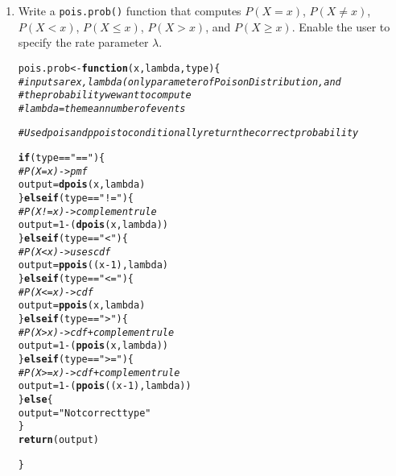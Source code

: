 \documentclass{article}\usepackage[]{graphicx}\usepackage[]{xcolor}
\makeatletter
\newcommand{\hlnum}[1]{\textcolor[rgb]{0.686,0.059,0.569}{#1}}%
\newcommand{\hlsng}[1]{\textcolor[rgb]{0.192,0.494,0.8}{#1}}%
\newcommand{\hlcom}[1]{\textcolor[rgb]{0.678,0.584,0.686}{\textit{#1}}}%
\newcommand{\hlopt}[1]{\textcolor[rgb]{0,0,0}{#1}}%
\newcommand{\hldef}[1]{\textcolor[rgb]{0.345,0.345,0.345}{#1}}%
\newcommand{\hlkwa}[1]{\textcolor[rgb]{0.161,0.373,0.58}{\textbf{#1}}}%
\newcommand{\hlkwb}[1]{\textcolor[rgb]{0.69,0.353,0.396}{#1}}%
\newcommand{\hlkwc}[1]{\textcolor[rgb]{0.333,0.667,0.333}{#1}}%
\newcommand{\hlkwd}[1]{\textcolor[rgb]{0.737,0.353,0.396}{\textbf{#1}}}%
\newenvironment{kframe}{%
 \def\at@end@of@kframe{}%
 \ifinner\ifhmode%
  \def\at@end@of@kframe{\end{minipage}}%
  \begin{minipage}{\columnwidth}%
 \fi\fi%
 \def\FrameCommand##1{\hskip\@totalleftmargin \hskip-\fboxsep
 \colorbox{shadecolor}{##1}\hskip-\fboxsep
     \hskip-\linewidth \hskip-\@totalleftmargin \hskip\columnwidth}%
 \MakeFramed {\advance\hsize-\width
   \@totalleftmargin\z@ \linewidth\hsize
   \@setminipage}}%
 {\par\unskip\endMakeFramed%
 \at@end@of@kframe}
\newenvironment{knitrout}{}{} %
\makeatother
\begin{document}
  \begin{enumerate}
    \item Write a \texttt{pois.prob()} function that computes $P(X=x)$, 
    $P(X \neq x)$, $P(X<x)$, $P(X \leq x)$, $P(X > x)$, and $P(X \geq x).$ Enable the user to specify the rate parameter $\lambda$.
\begin{knitrout}\scriptsize
{}\color{fgcolor}\begin{kframe}
\begin{alltt}
\hldef{pois.prob} \hlkwb{<-} \hlkwa{function}\hldef{(}\hlkwc{x}\hldef{,} \hlkwc{lambda}\hldef{,} \hlkwc{type}\hldef{)\{}
  \hlcom{# inputs are x, lambda (only parameter of Poison Distribution, and }
  \hlcom{#the probability we want to compute}
  \hlcom{# lambda = the mean number of events}

  \hlcom{# Use dpois and ppois to conditionally return the correct probability}

  \hlkwa{if} \hldef{(type} \hlopt{==} \hlsng{"=="}\hldef{)\{}
    \hlcom{# P(X = x) -> pmf}
    \hldef{output} \hlkwb{=} \hlkwd{dpois}\hldef{(x, lambda)}
  \hldef{\}}\hlkwa{else if} \hldef{(type} \hlopt{==} \hlsng{"!="}\hldef{)\{}
    \hlcom{# P(X != x) -> complement rule}
    \hldef{output} \hlkwb{=} \hlnum{1} \hlopt{-} \hldef{(}\hlkwd{dpois}\hldef{(x, lambda))}
  \hldef{\}}\hlkwa{else if} \hldef{(type} \hlopt{==} \hlsng{"<"}\hldef{)\{}
    \hlcom{# P(X < x) -> uses cdf}
    \hldef{output} \hlkwb{=} \hlkwd{ppois}\hldef{((x}\hlopt{-}\hlnum{1}\hldef{), lambda)}
  \hldef{\}}\hlkwa{else if} \hldef{(type} \hlopt{==} \hlsng{"<="}\hldef{)\{}
    \hlcom{# P(X <= x) -> cdf}
    \hldef{output} \hlkwb{=} \hlkwd{ppois}\hldef{(x, lambda)}
  \hldef{\}}\hlkwa{else if} \hldef{(type} \hlopt{==} \hlsng{">"}\hldef{)\{}
    \hlcom{# P(X > x) -> cdf + complement rule}
    \hldef{output} \hlkwb{=} \hlnum{1} \hlopt{-} \hldef{(}\hlkwd{ppois}\hldef{(x, lambda))}
  \hldef{\}}\hlkwa{else if} \hldef{(type} \hlopt{==} \hlsng{">="}\hldef{)\{}
    \hlcom{# P(X >= x) -> cdf + complement rule}
    \hldef{output} \hlkwb{=} \hlnum{1} \hlopt{-} \hldef{(}\hlkwd{ppois}\hldef{((x}\hlopt{-}\hlnum{1}\hldef{), lambda))}
  \hldef{\}} \hlkwa{else} \hldef{\{}
    \hldef{output} \hlkwb{=} \hlsng{"Not correct type"}
  \hldef{\}}
  \hlkwd{return}\hldef{(output)}

\hldef{\}}


\end{alltt}
\end{kframe}
\end{knitrout}
\end{enumerate}
\end{document}
